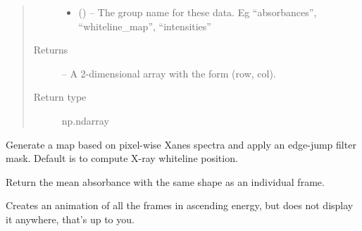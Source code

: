 \documentclass[letterpaper,10pt,english]{sphinxmanual}
\begin{document}
\begin{fulllineitems}
\begin{fulllineitems}
\begin{quote}
\begin{description}
\begin{itemize}
\item {} 
 () -- The group name for these data. Eg ``absorbances'',
``whiteline\_map'', ``intensities''

\end{itemize}

\item[{Returns}] \leavevmode
{} -- A 2-dimensional array with the form (row, col).

\item[{Return type}] \leavevmode
np.ndarray

\end{description}\end{quote}

\end{fulllineitems}


\begin{fulllineitems}
\label{\detokenize{xanespy:xanespy.xanes_frameset.XanesFrameset.masked_map}}
Generate a map based on pixel-wise Xanes spectra and apply an
edge-jump filter mask. Default is to compute X-ray whiteline
position.

\end{fulllineitems}


\begin{fulllineitems}
\label{\detokenize{xanespy:xanespy.xanes_frameset.XanesFrameset.mean_frame}}
Return the mean absorbance with the same shape as an individual
frame.

\end{fulllineitems}


\begin{fulllineitems}
\label{\detokenize{xanespy:xanespy.xanes_frameset.XanesFrameset.movie_plotter}}
Creates an animation of all the frames in ascending energy, but
does not display it anywhere, that's up to you.

\end{fulllineitems}


\end{fulllineitems}
\end{document}
